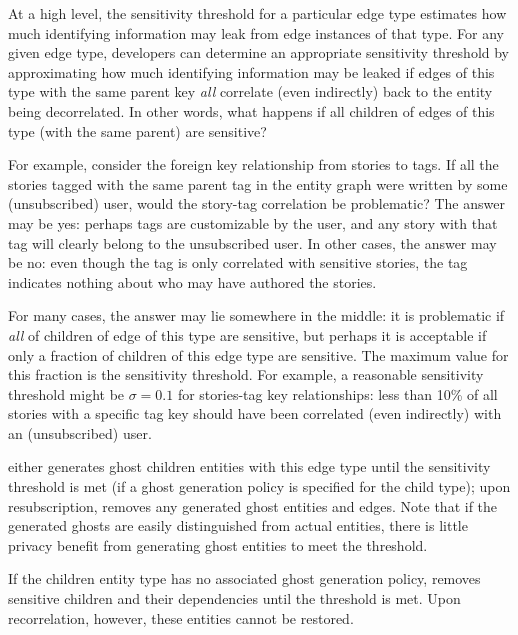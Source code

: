         At a high level, the sensitivity threshold for a particular edge type estimates how much identifying
        information may leak from edge instances of that type.  For any given edge type, developers can
        determine an appropriate sensitivity threshold by approximating how much identifying information
        may be leaked if edges of this type with the same parent key \emph{all} correlate (even indirectly)
        back to the entity being decorrelated. In other words, what happens if all children of edges of this
        type (with the same parent) are sensitive?

        For example, consider the foreign key relationship from stories to tags. If all
        the stories tagged with the same parent tag in the entity graph were written by some
        (unsubscribed) user, would the story-tag correlation be problematic? The answer may be yes: 
        perhaps tags are customizable by the user, and any story with that tag will clearly
        belong to the unsubscribed user. In other cases, the answer may be no: even though the tag is only
        correlated with sensitive stories, the tag indicates nothing about who may have authored the stories.

        For many cases, the answer may lie somewhere in the middle: it is problematic if \emph{all} of
        children of edge of this type are sensitive, but perhaps it is acceptable if only a fraction of
        children of this edge type are sensitive. The maximum value for this fraction is the sensitivity threshold.
        For example, a reasonable sensitivity threshold might be $\sigma = 0.1$ for stories-tag key relationships:
        less than 10\% of all stories with a specific tag key should have been correlated (even
        indirectly) with an (unsubscribed) user. 

        \sys either generates ghost children entities with this edge type until the
        sensitivity threshold is met (if a ghost generation policy is specified for the child type); upon
        resubscription, \sys removes any generated ghost entities and edges.
        Note that if the generated ghosts are easily distinguished from actual entities, there is
        little privacy benefit from generating ghost entities to meet the threshold.

        If the children entity type has no associated ghost generation policy, \sys removes
        sensitive children and their dependencies until the threshold is met.  Upon recorrelation,
        however, these entities cannot be restored.

